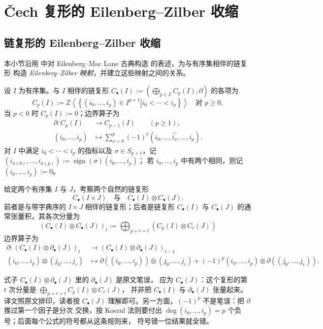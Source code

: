 \appendix

\section{\v{C}ech 复形的 Eilenberg--Zilber 收缩}\label{sec:Eilenberg-Zilber-constraction}

\subsection{链复形的 Eilenberg--Zilber 收缩}

本小节沿用 \cite[\S 3]{Franz} 中对 Eilenberg--Mac Lane 古典构造
\cite{EilenbergMacLane1953,EilenbergMacLane1954} 的表述，为与有序集相伴的链复形
构造 \emph{Eilenberg--Zilber 映射}，并建立这些映射之间的关系。

设 $I$ 为有序集。与 $I$ 相伴的链复形
$
C_{\bullet}(I)
:=
\left(\bigoplus_{p\in\mathbb{Z}}C_p(I),\partial\right)
$
的各项为
$$
C_p(I)
:=
\mathbb{Z}\left<\left\{\left.(i_0,\dots,i_p)\in I^{p+1}\right|i_0<\cdots<i_p\right\}\right>
\quad\text{对 }p\ge0,
$$
当 $p<0$ 时 $C_p(I):=0$；边界算子为
\begin{align*}
\partial:C_p(I)
&\rightarrow
C_{p-1}(I)
\qquad
(p\ge 1),
\\
(i_0,\dots,i_p)
&\mapsto
\sum_{\nu=0}^p
(-1)^{\nu}
(i_0,\dots,\hat{i_{\nu}},\dots,i_p).
\end{align*}
对 $I$ 中满足 $i_0<\cdots<i_p$ 的指标以及 $\sigma\in S_{p+1}$，记
$
(i_{\sigma(0)},\dots,i_{\sigma(p)})
:=
\operatorname{sign}(\sigma)
(i_0,\dots,i_p)
$；
若 $i_0,\dots,i_p$ 中有两个相同，则记 $(i_0,\dots,i_p):=0$。

给定两个有序集 $I$ 与 $J$，考察两个自然的链复形
$$
C_{\bullet}(I\times J)
\quad\text{与}\quad
C_{\bullet}(I)\otimes C_{\bullet}(J).
$$
前者是与带字典序的 $I\times J$ 相伴的链复形；后者是链复形 $C_{\bullet}(I)$ 与
$C_{\bullet}(J)$ 的通常张量积，其各次分量为
$$
(C_{\bullet}(I)\otimes C_{\bullet}(J))_t
:=
\bigoplus_{p+r=t}
\left(C_p(I)\otimes C_r(J)\right)
$$
边界算子为
\begin{align*}
\partial:
(C_{\bullet}(I)\otimes \partial_{\bullet}(J))_t
&\rightarrow
(C_{\bullet}(I)\otimes \partial_{\bullet}(J))_{t-1}
\\[2mm]
(i_0,\dots,i_p)\otimes(j_0,\dots,j_r)
&\mapsto
\partial((i_0,\dots,i_p))\otimes(j_0,\dots,j_r)
+
(-1)^p
(i_0,\dots,i_p)\otimes\partial((j_0,\dots,j_r)).
\end{align*}

\begin{yizhu}[分次符号与一处下标笔误]
式子 $C_{\bullet}(I)\otimes\partial_{\bullet}(J)$ 里的 $\partial_{\bullet}(J)$ 是原文笔误，
应为 $C_{\bullet}(J)$：这个复形的第 $t$ 次分量是 $\bigoplus_{p+r=t}C_p(I)\otimes C_r(J)$，
并非把 $C_{\bullet}(I)$ 与 $\partial_{\bullet}(J)$ 张量起来。译文照原文排印，读者按
$C_{\bullet}(J)$ 理解即可。另一方面，$(-1)^p$ 不是笔误：把 $\partial$ 推过第一个因子是分次
交换，按 Koszul 法则要付出 $\deg(i_0,\dots,i_p)=p$ 个负号；后面每个公式的符号都从这条规则来，
符号错一位结果就全错。
\end{yizhu}

